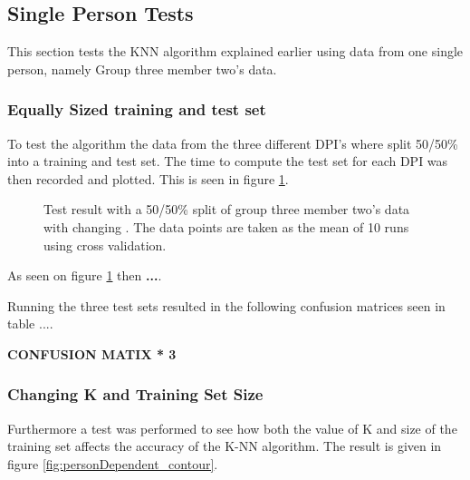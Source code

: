 
\subsection{Single Person Tests}
This section tests the KNN algorithm explained earlier using data from one single person, namely Group three member two's data.
%
%
%
%

\subsubsection{Equally Sized training and test set}
To test the algorithm the data from the three different DPI's where split 50/50\% into a training and test set. The time to compute the test set for each DPI was then recorded and plotted. This is seen in figure \ref{fig:PersonDependent_5050}.

\begin{figure}[H]
\centering
\caption{Test result with a 50/50\% split of group three member two's data with changing . The data points are taken as the mean of 10 runs using cross validation.}
\label{fig:PersonDependent_5050}
\end{figure}

As seen on figure \ref{fig:PersonDependent_5050} then \textbf{...}.

Running the three test sets resulted in the following confusion matrices seen in table ....

\textbf{CONFUSION MATIX * 3}




\subsubsection{Changing K and Training Set Size}
Furthermore a test was performed to see how both the value of K and size of the training set affects the accuracy of the K-NN algorithm. The result is given in figure \ref{fig:personDependent_contour}.

